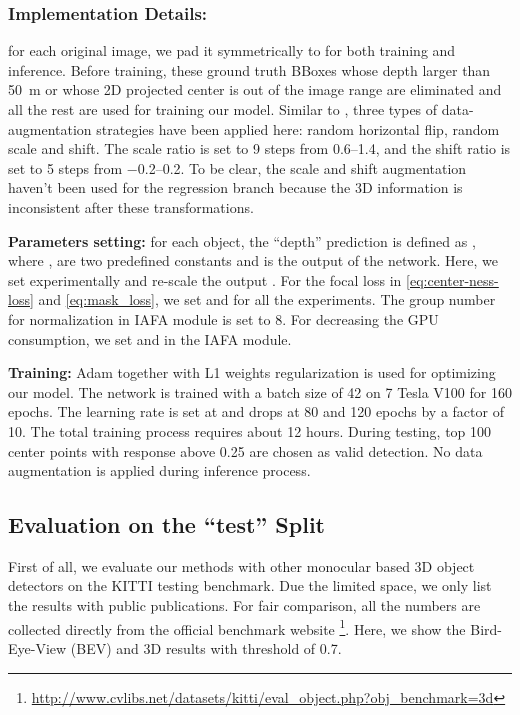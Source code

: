\subsubsection{Implementation Details:} 
for each original image, we pad it symmetrically to  for both training and inference. Before training, these ground truth BBoxes whose depth larger than \SI{50}{\metre} or whose 2D projected center is out of the image range are eliminated and all the rest are used for training our model. Similar to \cite{liu2020smoke}, three types of data-augmentation strategies have been applied here: random horizontal flip, random scale and shift. The scale ratio is set to 9 steps from \numrange{0.6}{1.4}, and the shift ratio is set to 5 steps from \numrange{-0.2}{0.2}. To be clear, the scale and shift augmentation haven't been used for the regression branch because the 3D information is inconsistent after these transformations.   

\textbf{Parameters setting:} for each object, the ``depth'' prediction is defined as , where ,  are two predefined constants and  is the output of the network. Here, we set  experimentally and re-scale the output . For the focal loss in \eqref{eq:center-ness-loss} and \eqref{eq:mask_loss}, we set  and  for all the experiments. The group number for normalization in IAFA module is set to 8. For decreasing the GPU consumption, we set  and  in the IAFA module.

\textbf{Training:} Adam \cite{kingma2014adam} together with L1 weights regularization is used for optimizing our model. The network is trained with a batch size of 42 on 7 Tesla V100 for 160 epochs. The learning rate is set at  and drops at 80 and 120 epochs by a factor of 10. The total training process requires about 12 hours. During testing, top 100 center points with response above 0.25 are chosen as valid detection. No data augmentation is applied during inference process. 

\subsection{Evaluation on the ``test'' Split}


First of all, we evaluate our methods with other monocular based 3D object detectors on the KITTI testing benchmark. Due the limited space, we only list the results with public publications. For fair comparison, all the numbers are collected directly from the official benchmark website \footnote{\url{http://www.cvlibs.net/datasets/kitti/eval_object.php?obj_benchmark=3d}}. Here, we show the Bird-Eye-View (BEV) and 3D results with threshold of 0.7.



